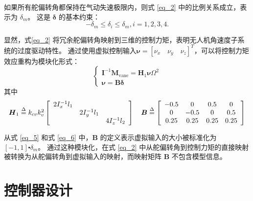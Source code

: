 如果所有舵偏转角都保持在气动失速极限内，则式 \eqref{eq_2} 中的比例关系成立，表示为 $ {{\delta }_{m}} $。 这是 ${\boldsymbol \delta}$ 的基本约束：
\begin{equation} 
	- {\delta _m} \le {\delta _i} \le {\delta _m},   i = 1,2,3,4.
	\label{eq_4}
\end{equation}

显然，式\eqref{eq_2} 将冗余舵偏转角映射到三维的控制力矩，表明无人机角速度子系统的过度驱动特性。 通过使用虚拟控制输入$ \boldsymbol{\nu }=[{\nu }_{x} \quad {\nu }_{y} \quad {\nu }_{z}]^{T}$，可以将控制力矩效应重构为模块化形式：
\begin{equation}
	\left\{ \begin{array}{l}
	{{\boldsymbol{I}}^{ - 1}}{{\boldsymbol{M}}_\text{vane}} = {{\boldsymbol{H}}_1}{\boldsymbol{\nu }}{\Omega ^2}\\
	{\boldsymbol{\nu }} = {\boldsymbol{B\delta }}
	\end{array} \right.
	\label{eq_5}
	\end{equation}
其中
	\begin{equation}
	\begin{array}{ccccc}
	{{\boldsymbol{H}}_1} \buildrel \Delta \over =   {k_{cv}}k_v^2\left[ {\begin{array}{*{20}{c}}
		{2I_x^{ - 1}{l_1}}&{}&{}\\
		{}&{2I_y^{ - 1}{l_1}}&{}\\
		{}&{}&{4I_z^{ - 1}{l_2}}
		\end{array}} \right]     \quad
	{\boldsymbol{B}} \buildrel \Delta \over =   \left[ {\begin{array}{*{20}{c}}
		{ - 0.5}&0&{0.5}&0\\
		0&{ - 0.5}&0&{0.5}\\
		{0.25}&{0.25}&{0.25}&{0.25}
		\end{array}} \right]
	\end{array}
	\label{eq_6}
\end{equation}

从式 \eqref{eq_5} 和式 \eqref{eq_6} 中，$\boldsymbol{B}$ 的定义表示虚拟输入的大小被标准化为 $[-1,1] \centerdot {{\delta }_{m }}$。 通过这种模块化，在式 \eqref{eq_2} 中从舵偏转角到控制力矩的直接映射被转换为从舵偏转角到虚拟输入的映射，而映射矩阵 $\boldsymbol{B}$ 不包含模型信息。

\section{控制器设计}


